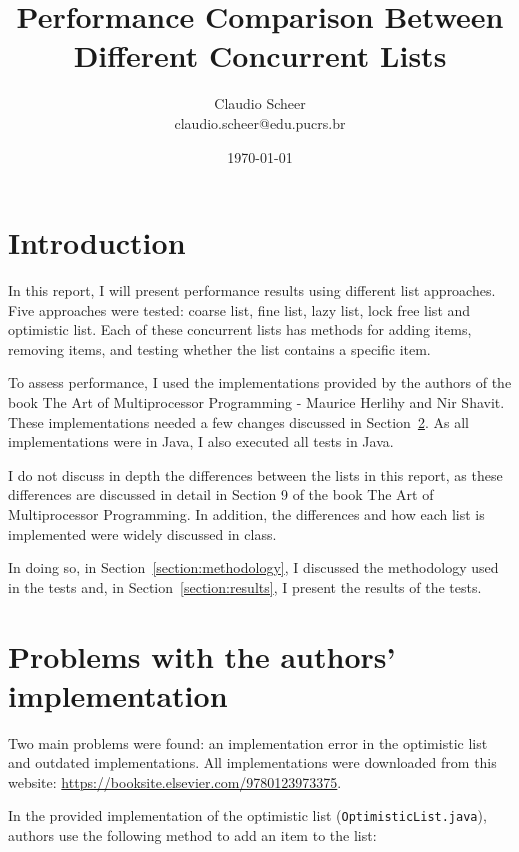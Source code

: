 \documentclass{article}
\title{Performance Comparison Between Different Concurrent Lists}
\author{
    Claudio Scheer\\
    claudio.scheer@edu.pucrs.br
}
\date{\today}
\begin{document}
\maketitle

\section{Introduction}

In this report, I will present performance results using different list approaches. Five approaches were tested: coarse list, fine list, lazy list, lock free list and optimistic list. Each of these concurrent lists has methods for adding items, removing items, and testing whether the list contains a specific item.

To assess performance, I used the implementations provided by the authors of the book The Art of Multiprocessor Programming - Maurice Herlihy and Nir Shavit. These implementations needed a few changes discussed in Section~\ref{section:list_problems}. As all implementations were in Java, I also executed all tests in Java.

I do not discuss in depth the differences between the lists in this report, as these differences are discussed in detail in Section 9 of the book The Art of Multiprocessor Programming. In addition, the differences and how each list is implemented were widely discussed in class.

In doing so, in Section~\ref{section:methodology}, I discussed the methodology used in the tests and, in Section~\ref{section:results}, I present the results of the tests.


\section{Problems with the authors' implementation} \label{section:list_problems}

Two main problems were found: an implementation error in the optimistic list and outdated implementations. All implementations were downloaded from this website: \url{https://booksite.elsevier.com/9780123973375}.

In the provided implementation of the optimistic list (\texttt{OptimisticList.java}), authors use the following method to add an item to the list:
\end{document}
